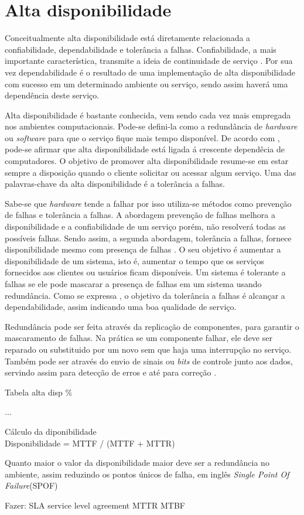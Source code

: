 \chapter{Alta disponibilidade}
Conceitualmente alta disponibilidade está diretamente relacionada a confiabilidade, dependabilidade e tolerância a falhas. 
Confiabilidade, a mais importante característica, transmite a ideia de continuidade de serviço \cite{pankaj1994}.
Por sua vez dependabilidade é o resultado de uma implementação de alta disponibilidade com sucesso em um determinado ambiente ou serviço,
sendo assim haverá uma dependência deste serviço.

Alta disponibilidade é bastante conhecida, vem sendo cada vez mais empregada nos ambientes computacionais.
Pode-se defini-la como a redundância de \textit{hardware} ou \textit{software} para que o serviço fique mais tempo disponível.
De acordo com \cite{costa2009}, pode-se afirmar que alta disponibilidade está ligada á crescente dependêcia de computadores.
O objetivo de promover alta disponibilidade resume-se em estar sempre a disposição quando o cliente solicitar ou acessar algum serviço.
Uma das palavras-chave da alta disponibilidade é a tolerância a falhas.

Sabe-se que \textit{hardware} tende a falhar por isso utiliza-se métodos como prevenção de falhas e tolerância a falhas.
A abordagem prevenção de falhas melhora a disponibilidade e a confiabilidade de um serviço porém, não resolverá todas as possíveis falhas.
Sendo assim, a segunda abordagem, tolerância a falhas, fornece disponibilidade mesmo com presença de falhas \cite{pankaj1994}.
O seu objetivo é aumentar a disponibilidade de um sistema, isto é, aumentar o tempo que os serviços fornecidos aos clientes ou usuários ficam disponíveis. 
Um sistema é tolerante a falhas se ele pode mascarar a presença de falhas em um sistema usando redundância. Como se expressa \cite{costa2009}, 
o objetivo da tolerância a falhas é alcançar a dependabilidade, assim indicando uma boa qualidade de serviço.

Redundância pode ser feita através da replicação de componentes, para garantir o mascaramento de falhas.
Na prática se um componente falhar, ele deve ser reparado ou substituido por um novo sem que haja uma interrupção no serviço.
Também pode ser através do envio de sinais ou \textit{bits} de controle junto aos dados, servindo assim para detecção de erros e até para correção \cite{weber2002}.

Tabela alta disp \%

...

Cálculo da diponibilidade\\
Disponibilidade = MTTF / (MTTF + MTTR)

Quanto maior o valor da disponibilidade maior deve ser a redundância no ambiente, assim reduzindo os pontos únicos de falha,
em inglês \textit{Single Point Of Failure}(SPOF)

Fazer: 
SLA service level agreement
MTTR
MTBF
